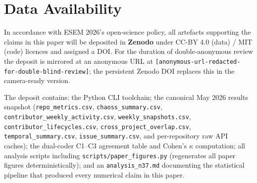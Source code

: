 \documentclass[a4paper,UKenglish,cleveref,autoref,thm-restate]{lipics-v2021}
\begin{document}
\section*{Data Availability}\label{sec:data-availability}

In accordance with ESEM 2026's open-science policy, all artefacts supporting the claims in this paper will be deposited in \textbf{Zenodo} under CC-BY 4.0 (data) / MIT (code) licences and assigned a DOI. For the duration of double-anonymous review the deposit is mirrored at an anonymous URL at \texttt{[anonymous-url-redacted-for-double-blind-review]}; the persistent Zenodo DOI replaces this in the camera-ready version.

The deposit contains: the Python CLI toolchain; the canonical May 2026 results snapshot (\texttt{repo\_metrics.csv}, \texttt{chaoss\_summary.csv}, \texttt{contributor\_weekly\_activity.csv}, \texttt{weekly\_snapshots.csv}, \texttt{contributor\_lifecycles.csv}, \texttt{cross\_project\_overlap.csv}, \texttt{temporal\_summary.csv}, \texttt{issue\_summary.csv}, and per-repository raw API caches); the dual-coder C1--C3 agreement table and Cohen's $\kappa$ computation; all analysis scripts including \texttt{scripts/paper\_figures.py} (regenerates all paper figures deterministically); and an \texttt{analysis\_n37.md} documenting the statistical pipeline that produced every numerical claim in this paper.



\end{document}
